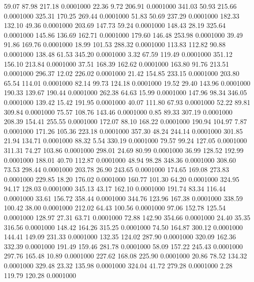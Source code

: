   59.07   87.98  217.18   0.0001000
  22.36    9.72  206.91   0.0001000
 341.03   50.93  215.66   0.0001000
 325.31  170.25  269.44   0.0001000
  51.83   50.69  237.29   0.0001000
 182.33  132.10   49.36   0.0001000
 203.69  147.73   59.24   0.0001000
 148.43   28.19  325.64   0.0001000
 145.86  136.69  162.71   0.0001000
 179.60  146.48  253.98   0.0001000
  39.49   91.86  169.76   0.0001000
  18.99  101.53  288.32   0.0001000
 113.83  112.82   90.88   0.0001000
 138.48   61.53  345.20   0.0001000
   3.32   67.59  119.49   0.0001000
 351.12  156.10  213.84   0.0001000
  37.51  168.39  162.62   0.0001000
 163.80   91.76  213.51   0.0001000
 296.37   12.02  226.02   0.0001000
  21.42  154.85  233.15   0.0001000
 203.80   65.54  114.01   0.0001000
  82.14   99.73  124.18   0.0001000
  19.52   29.40  143.96   0.0001000
 190.33  139.67  190.44   0.0001000
 262.38   64.63   15.99   0.0001000
 147.96   98.34  346.05   0.0001000
 139.42   15.42  191.95   0.0001000
  40.07  111.80   67.93   0.0001000
  52.22   89.81  309.84   0.0001000
  75.57  108.76  143.46   0.0001000
   0.85   89.33  307.19   0.0001000
 208.39  154.41  255.55   0.0001000
 172.07   88.10  168.22   0.0001000
 190.94  104.97    7.87   0.0001000
 171.26  105.36  223.18   0.0001000
 357.30   48.24  244.14   0.0001000
 301.85   21.94  134.71   0.0001000
  88.32    5.54  330.19   0.0001000
  79.57   99.24  127.05   0.0001000
 311.31   74.27  103.86   0.0001000
 298.01   24.69   80.99   0.0001000
  36.99  128.52  192.99   0.0001000
 188.01   40.70  112.87   0.0001000
  48.94   98.28  348.36   0.0001000
 308.60   73.53  298.44   0.0001000
 203.78   26.90  243.65   0.0001000
 174.65  169.08  273.83   0.0001000
 229.85   18.20  176.02   0.0001000
 160.77  101.30   64.20   0.0001000
 324.95   94.17  128.03   0.0001000
 345.13   43.17  162.10   0.0001000
 191.74   83.34  116.44   0.0001000
  33.61  156.72  358.44   0.0001000
 344.76  123.96  167.38   0.0001000
 338.59  100.42   38.00   0.0001000
 212.02   64.43  100.56   0.0001000
  97.06  152.78  125.54   0.0001000
 128.97   27.31   63.71   0.0001000
  72.88  142.90  354.66   0.0001000
  24.40   35.35  316.56   0.0001000
 148.42  164.26  315.25   0.0001000
  74.50  164.87  300.12   0.0001000
 144.41  149.09  231.33   0.0001000
 132.35  124.02  287.90   0.0001000
 320.09  162.36  332.39   0.0001000
 191.49  159.46  281.78   0.0001000
  58.09  157.22  245.43   0.0001000
 297.76  165.48   10.89   0.0001000
 227.62  168.08  225.90   0.0001000
  20.86   78.52  134.32   0.0001000
 329.48   23.32  135.98   0.0001000
 324.04   41.72  279.28   0.0001000
   2.28  119.79  120.28   0.0001000
